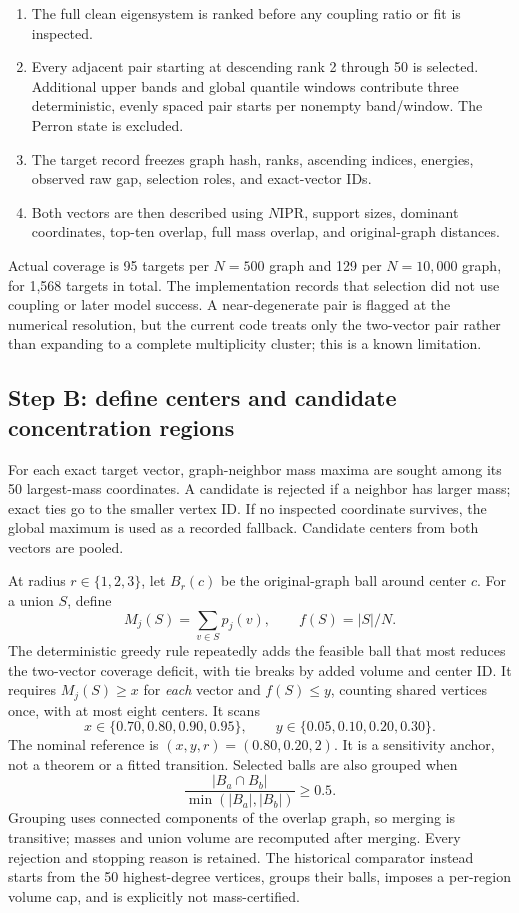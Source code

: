 \documentclass[11pt]{article}
\begin{document}
\begin{enumerate}
\item The full clean eigensystem is ranked before any coupling ratio or fit is inspected.
\item Every adjacent pair starting at descending rank 2 through 50 is selected.  Additional upper bands and global quantile windows contribute three deterministic, evenly spaced pair starts per nonempty band/window.  The Perron state is excluded.
\item The target record freezes graph hash, ranks, ascending indices, energies, observed raw gap, selection roles, and exact-vector IDs.
\item Both vectors are then described using \(N\mathrm{IPR}\), support sizes, dominant coordinates, top-ten overlap, full mass overlap, and original-graph distances.
\end{enumerate}

Actual coverage is 95 targets per \(N=500\) graph and 129 per \(N=10{,}000\) graph, for 1,568 targets in total.  The implementation records that selection did not use coupling or later model success.  A near-degenerate pair is flagged at the numerical resolution, but the current code treats only the two-vector pair rather than expanding to a complete multiplicity cluster; this is a known limitation.

\subsection{Step B: define centers and candidate concentration regions}

For each exact target vector, graph-neighbor mass maxima are sought among its 50 largest-mass coordinates.  A candidate is rejected if a neighbor has larger mass; exact ties go to the smaller vertex ID.  If no inspected coordinate survives, the global maximum is used as a recorded fallback.  Candidate centers from both vectors are pooled.

At radius \(r\in\{1,2,3\}\), let \(B_r(c)\) be the original-graph ball around center \(c\).  For a union \(S\), define
\[
 M_j(S)=\sum_{v\in S}p_j(v),\qquad f(S)=|S|/N.
\]
The deterministic greedy rule repeatedly adds the feasible ball that most reduces the two-vector coverage deficit, with tie breaks by added volume and center ID.  It requires \(M_j(S)\geq x\) for \emph{each} vector and \(f(S)\leq y\), counting shared vertices once, with at most eight centers.  It scans
\[
 x\in\{0.70,0.80,0.90,0.95\},\qquad
 y\in\{0.05,0.10,0.20,0.30\}.
\]
The nominal reference is \((x,y,r)=(0.80,0.20,2)\).  It is a sensitivity anchor, not a theorem or a fitted transition.  Selected balls are also grouped when
\[
 \frac{|B_a\cap B_b|}{\min(|B_a|,|B_b|)}\geq0.5.
\]
Grouping uses connected components of the overlap graph, so merging is transitive; masses and union volume are recomputed after merging.  Every rejection and stopping reason is retained.  The historical comparator instead starts from the 50 highest-degree vertices, groups their balls, imposes a per-region volume cap, and is explicitly not mass-certified.
\end{document}
